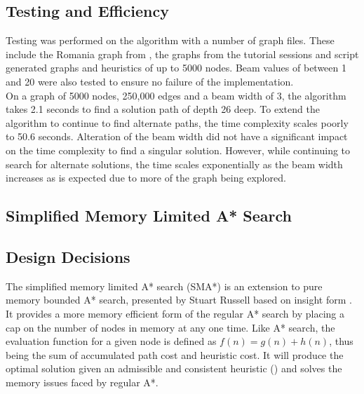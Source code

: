 \documentclass[]{article}
\begin{document}
\subsection*{Testing and Efficiency}

Testing was performed on the algorithm with a number of graph files. These include the Romania graph from \cite{norvig}, the graphs from the tutorial sessions and script generated graphs and heuristics of up to 5000 nodes. Beam values of between 1 and 20 were also tested to ensure no failure of the implementation.\\

On a graph of 5000 nodes, 250,000 edges and a beam width of 3, the algorithm takes 2.1 seconds to find a solution path of depth 26 deep. To extend the algorithm to continue to find alternate paths, the time complexity scales poorly to 50.6 seconds. Alteration of the beam width did not have a significant impact on the time complexity to find a singular solution. However, while continuing to search for alternate solutions, the time scales exponentially as the beam width increases as is expected due to more of the graph being explored.

\vspace{1cm}
\begin{center}
	\section*{Simplified Memory Limited A* Search}
\end{center}

\vspace*{0.8cm}
\subsection*{Design Decisions}

The simplified memory limited A* search (SMA*) is an extension to pure memory bounded A* search, presented by Stuart Russell \cite{russell_paper} based on insight form \cite{chakra}. It provides a more memory efficient form of the regular A* search by placing a cap on the number of nodes in memory at any one time. Like A* search, the evaluation function for a given node is defined as $f(n)=g(n)+h(n)$, thus being the sum of accumulated path cost and heuristic cost. It will produce the optimal solution given an admissible and consistent heuristic (\cite{norvig}) and solves the memory issues faced by regular A*. \\
\end{document}
